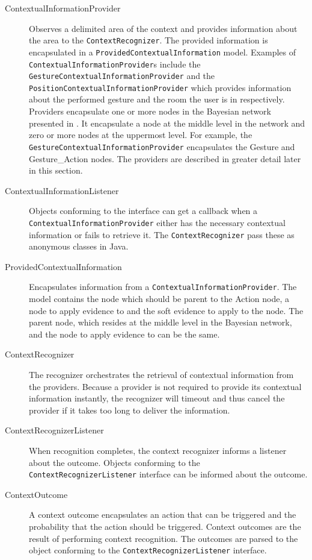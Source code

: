 \begin{description}
\item[ContextualInformationProvider] Observes a delimited area of the context and provides information about the area to the \texttt{ContextRecognizer}. The provided information is encapsulated in a \texttt{ProvidedContextualInformation} model. Examples of \texttt{ContextualInformationProvider}s include the \texttt{GestureContextualInformationProvider} and the \texttt{PositionContextualInformationProvider} which provides information about the performed gesture and the room the user is in respectively. Providers encapsulate one or more nodes in the Bayesian network presented in . It encapsulate a node at the middle level in the network and zero or more nodes at the uppermost level. For example, the \texttt{GestureContextualInformationProvider} encapsulates the Gesture and Gesture\_Action nodes. The providers are described in greater detail later in this section.
\item[ContextualInformationListener] Objects conforming to the interface can get a callback when a \texttt{ContextualInformationProvider} either has the necessary contextual information or fails to retrieve it. The \texttt{ContextRecognizer} pass these as anonymous classes in Java.
\item[ProvidedContextualInformation] Encapsulates information from a \texttt{ContextualInformationProvider}. The model contains the node which should be parent to the Action node, a node to apply evidence to and the soft evidence to apply to the node. The parent node, which resides at the middle level in the Bayesian network, and the node to apply evidence to can be the same.
\item[ContextRecognizer] The recognizer orchestrates the retrieval of contextual information from the providers. Because a provider is not required to provide its contextual information instantly, the recognizer will timeout and thus cancel the provider if it takes too long to deliver the information.
\item[ContextRecognizerListener] When recognition completes, the context recognizer informs a listener about the outcome. Objects conforming to the \texttt{ContextRecognizerListener} interface can be informed about the outcome.
\item[ContextOutcome] A context outcome encapsulates an action that can be triggered and the probability that the action should be triggered. Context outcomes are the result of performing context recognition. The outcomes are parsed to the object conforming to the \texttt{ContextRecognizerListener} interface.
\end{description}

